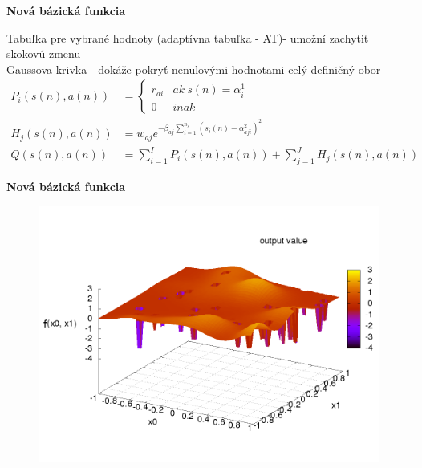 \documentclass[xcolor=dvipsnames]{beamer}
\begin{document}
\begin{frame}{\bf Nová bázická funkcia}

Tabuľka pre vybrané hodnoty (adaptívna tabuľka - AT)- umožní zachytit skokovú zmenu \\
Gaussova krivka - dokáže pokryť nenulovými hodnotami celý definičný obor \\

\begin{align}
P_i(s(n), a(n)) &=
\left\{
	\begin{array}{ll}
		r_{ai}  & ak \ s(n) = \alpha^1_i \\
		0 & inak
	\end{array}
\right. \\
  H_j(s(n), a(n)) &= w_{aj} e^{ -\beta_{aj} \sum\limits_{i=1}^{n_s}{(s_i(n) - \alpha^2_{aji})^2 }} \\
  Q(s(n), a(n)) &= \sum\limits_{i=1}^{I} P_i(s(n),a(n)) + \sum\limits_{j=1}^{J} H_j(s(n), a(n))
  \label{eq:peak_hill}
\end{align}


\end{frame}


\begin{frame}{\bf Nová bázická funkcia}

\begin{figure}[!htb]
\centering
\includegraphics[scale=.4]{../pictures/peak_hill_function.png}
\end{figure}

\end{frame}
\end{document}
